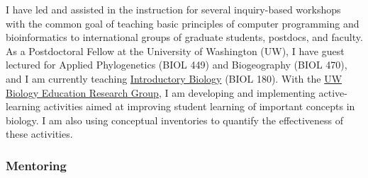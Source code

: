 I have led and assisted in the instruction for several inquiry-based workshops
with the common goal of teaching basic principles of computer programming and
bioinformatics to international groups of graduate students, postdocs, and
faculty.
As a Postdoctoral Fellow at the University of Washington (UW), I have
guest lectured for Applied Phylogenetics (BIOL 449) and Biogeography
(BIOL 470), and
I am currently teaching
\href{http://courses.biology.washington.edu/biol180/}{Introductory Biology}
(BIOL 180).
With the \href{https://sites.google.com/site/uwbioedresgroup/home}{UW Biology
    Education Research Group}, I am developing and implementing active-learning
activities aimed at improving student learning of important concepts in
biology.
I am also using conceptual inventories to quantify the effectiveness of these
activities.

\subsubsection*{Mentoring}

